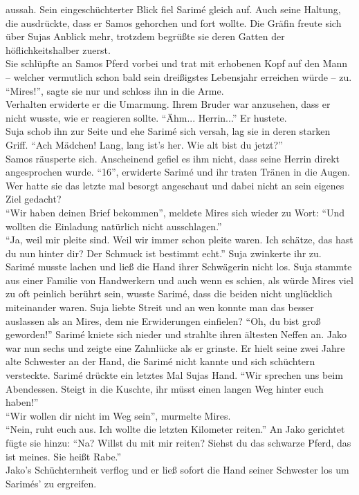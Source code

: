 aussah. Sein eingeschüchterter Blick fiel Sarimé gleich auf. Auch seine Haltung, die ausdrückte, 
dass er Samos gehorchen und fort wollte. Die Gräfin freute sich über Sujas Anblick mehr, trotzdem 
begrüßte sie deren Gatten der höflichkeitshalber zuerst. \\
Sie schlüpfte an Samos Pferd vorbei und trat mit erhobenen Kopf auf den Mann – welcher vermutlich 
schon bald sein dreißigstes Lebensjahr erreichen würde – zu. ``Mires!'', sagte sie nur und schloss 
ihn in die Arme. \\
Verhalten erwiderte er die Umarmung. Ihrem Bruder war anzusehen, dass er nicht wusste, wie er 
reagieren sollte. ``Ähm... Herrin...'' Er hustete.\\
Suja schob ihn zur Seite und ehe Sarimé sich versah, lag sie in deren starken Griff. 
``Ach Mädchen! Lang, lang ist's her. Wie alt bist du jetzt?''\\
Samos räusperte sich. Anscheinend gefiel es ihm nicht, dass seine Herrin direkt angesprochen wurde.
``16'', erwiderte Sarimé und ihr traten Tränen in die Augen. Wer hatte sie das letzte mal besorgt 
angeschaut und dabei nicht an sein eigenes Ziel gedacht? \\
``Wir haben deinen Brief bekommen'', meldete Mires sich wieder zu Wort: ``Und wollten die Einladung 
natürlich nicht ausschlagen.''\\
``Ja, weil mir pleite sind. Weil wir immer schon pleite waren. Ich schätze, das hast du nun hinter 
dir? Der Schmuck ist bestimmt echt.'' Suja zwinkerte ihr zu. \\
Sarimé musste lachen und ließ die Hand ihrer Schwägerin nicht los. Suja stammte aus einer Familie 
von Handwerkern und auch wenn es schien, als würde Mires viel zu oft peinlich berührt sein, wusste 
Sarimé, dass die beiden nicht unglücklich miteinander waren. Suja liebte Streit und an wen konnte 
man das besser auslassen als an Mires, dem nie Erwiderungen einfielen?
``Oh, du bist groß geworden!'' Sarimé kniete sich nieder und strahlte ihren ältesten Neffen an. 
Jako war nun sechs und zeigte eine Zahnlücke als er grinste. Er hielt seine zwei Jahre alte 
Schwester an der Hand, die Sarimé nicht kannte und sich schüchtern versteckte. Sarimé drückte ein 
letztes Mal Sujas Hand. ``Wir sprechen uns beim Abendessen. Steigt in die Kuschte, ihr müsst einen 
langen Weg hinter euch haben!''\\
``Wir wollen dir nicht im Weg sein'', murmelte Mires.\\
``Nein, ruht euch aus. Ich wollte die letzten Kilometer reiten.'' An Jako gerichtet fügte sie 
hinzu: ``Na? Willst du mit mir reiten? Siehst du das schwarze Pferd, das ist meines. Sie heißt 
Rabe.''\\
Jako's Schüchternheit verflog und er ließ sofort die Hand seiner Schwester los um Sarimés' zu 
ergreifen. \\



